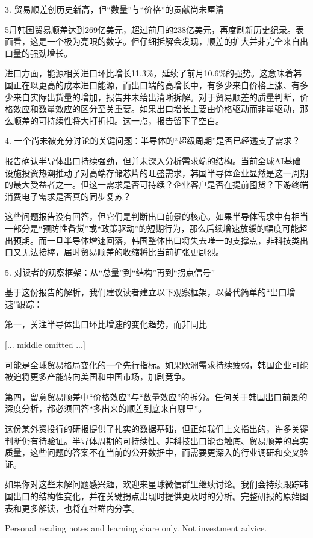 \documentclass[11pt]{ctexart}
\begin{document}
3. 贸易顺差创历史新高，但“数量”与“价格”的贡献尚未厘清

5月韩国贸易顺差达到269亿美元，超过前月的238亿美元，再度刷新历史纪录。表面看，这是一个极为亮眼的数字。但仔细拆解会发现，顺差的扩大并非完全来自出口量的强劲增长。

进口方面，能源相关进口环比增长11.3\%，延续了前月10.6\%的强势。这意味着韩国正在以更高的成本进口能源，而出口端的高增长中，有多少来自价格上涨、有多少来自实际出货量的增加，报告并未给出清晰拆解。对于贸易顺差的质量判断，价格效应和数量效应的区分至关重要。如果出口增长主要由价格驱动而非量驱动，那么顺差的可持续性将大打折扣。这一点，报告留下了空白。

4. 一个尚未被充分讨论的关键问题：半导体的“超级周期”是否已经透支了需求？

报告确认半导体出口持续强劲，但并未深入分析需求端的结构。当前全球AI基础设施投资热潮推动了对高端存储芯片的旺盛需求，韩国半导体企业显然是这一周期的最大受益者之一。但这一需求是否可持续？企业客户是否在提前囤货？下游终端消费电子需求是否真的同步复苏？

这些问题报告没有回答，但它们是判断出口前景的核心。如果半导体需求中有相当一部分是“预防性备货”或“政策驱动”的短期行为，那么后续增速放缓的幅度可能超出预期。而一旦半导体增速回落，韩国整体出口将失去唯一的支撑点，非科技类出口又无法接棒，届时贸易顺差的收缩将比当前扩张更剧烈。

5. 对读者的观察框架：从“总量”到“结构”再到“拐点信号”

基于这份报告的解析，我们建议读者建立以下观察框架，以替代简单的“出口增速”跟踪：

第一，关注半导体出口环比增速的变化趋势，而非同比

[... middle omitted ...]

可能是全球贸易格局变化的一个先行指标。如果欧洲需求持续疲弱，韩国企业可能被迫将更多产能转向美国和中国市场，加剧竞争。

第四，留意贸易顺差中“价格效应”与“数量效应”的拆分。任何关于韩国出口前景的深度分析，都必须回答“多出来的顺差到底来自哪里”。

这份某外资投行的研报提供了扎实的数据基础，但正如我们上文指出的，许多关键判断仍有待验证。半导体周期的可持续性、非科技出口能否触底、贸易顺差的真实质量，这些问题的答案不在当前的公开数据中，而需要更深入的行业调研和交叉验证。

如果你对这些未解问题感兴趣，欢迎来星球微信群里继续讨论。我们会持续跟踪韩国出口的结构性变化，并在关键拐点出现时提供更及时的分析。完整研报的原始图表和更多解读，也将在社群内分享。

Personal reading notes and learning share only. Not investment advice.
\end{document}
